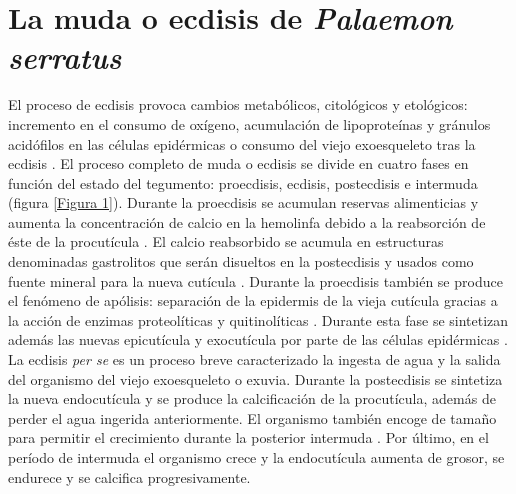 \documentclass[a4paper]{article}
\begin{document}
\section{La muda o ecdisis de \textit{Palaemon serratus}}
El proceso de ecdisis provoca cambios metabólicos, citológicos y etológicos: incremento en el consumo de oxígeno, acumulación de lipoproteínas y gránulos acidófilos en las células epidérmicas o consumo del viejo exoesqueleto tras la ecdisis \citep{Reeve1969}. El proceso completo de muda o ecdisis se divide en cuatro fases en función del estado del tegumento: proecdisis, ecdisis, postecdisis e intermuda (figura \ref{Figura 1}). Durante la proecdisis se acumulan reservas alimenticias y aumenta la concentración de calcio en la hemolinfa debido a la reabsorción de éste de la procutícula \citep{Arlot1986}. El calcio reabsorbido se acumula en estructuras denominadas gastrolitos que serán disueltos en la postecdisis y usados como fuente mineral para la nueva cutícula \citep{Tom2014}. Durante la proecdisis también se produce el fenómeno de apólisis: separación de la epidermis de la vieja cutícula gracias a la acción de enzimas proteolíticas y quitinolíticas \citep{Spindler1990}. Durante esta fase se sintetizan además las nuevas epicutícula y exocutícula por parte de las células epidérmicas \citep{Tom2014}. La ecdisis \textit{per se} es un proceso breve caracterizado la ingesta de agua y la salida del organismo del viejo exoesqueleto o exuvia. Durante la postecdisis se sintetiza la nueva endocutícula y se produce la calcificación de la procutícula, además de perder el agua ingerida anteriormente. El organismo también encoge de tamaño para permitir el crecimiento durante la posterior intermuda \citep{Hickman2002}. Por último, en el período de intermuda el organismo crece y la endocutícula aumenta de grosor, se endurece y se calcifica progresivamente.
\end{document}
